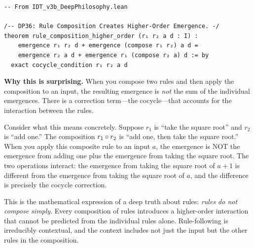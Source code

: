 \begin{lstlisting}
-- From IDT_v3b_DeepPhilosophy.lean

/-- DP36: Rule Composition Creates Higher-Order Emergence. -/
theorem rule_composition_higher_order (r₁ r₂ a d : I) :
    emergence r₁ r₂ d + emergence (compose r₁ r₂) a d =
    emergence r₂ a d + emergence r₁ (compose r₂ a) d := by
  exact cocycle_condition r₁ r₂ a d
\end{lstlisting}

\begin{surprisebox}
\noindent\textbf{Why this is surprising.}
When you compose two rules and then apply the composition to an input,
the resulting emergence is \emph{not} the sum of the individual
emergences.  There is a correction term---the cocycle---that accounts
for the interaction between the rules.

Consider what this means concretely.  Suppose $r_1$ is ``take the
square root'' and $r_2$ is ``add one.''  The composition $r_1 \circ r_2$
is ``add one, then take the square root.''  When you apply this
composite rule to an input $a$, the emergence is NOT the emergence from
adding one plus the emergence from taking the square root.  The two
operations interact: the emergence from taking the square root of
$a + 1$ is different from the emergence from taking the square root
of $a$, and the difference is precisely the cocycle correction.

This is the mathematical expression of a deep truth about rules:
\emph{rules do not compose simply}.  Every composition of rules
introduces a higher-order interaction that cannot be predicted from
the individual rules alone.  Rule-following is irreducibly contextual,
and the context includes not just the input but the other rules in
the composition.
\end{surprisebox}

